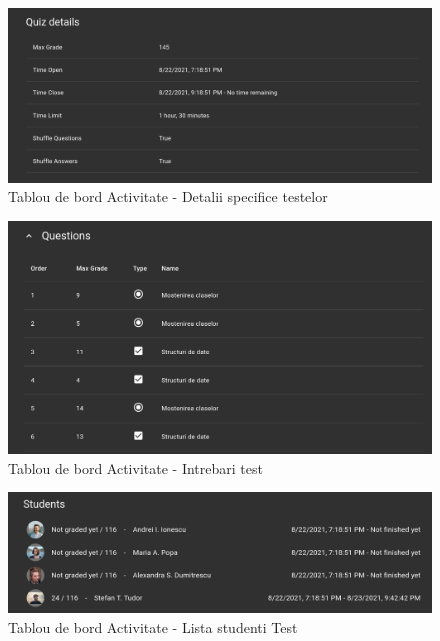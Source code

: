 \documentclass[12pt, a4paper, oneside, romanian]{teza-upb}
\begin{document}
\begin{figure}[H]
\centering
\includegraphics*[width=\columnwidth]{tablou-de-bord-activitate-detalii-specifice-testelor}
\caption{Tablou de bord Activitate - Detalii specifice testelor}
\label{tablou-de-bord-activitate-detalii-specifice-testelor}
\end{figure}

\begin{figure}[H]
\centering
\includegraphics*[width=\columnwidth]{tablou-de-bord-activitate-intrebari-test}
\caption{Tablou de bord Activitate - Intrebari test}
\label{tablou-de-bord-activitate-intrebari-test}
\end{figure}

\begin{figure}[H]
\centering
\includegraphics*[width=\columnwidth]{tablou-de-bord-activitate-lista-studenti-test}
\caption{Tablou de bord Activitate - Lista studenti Test}
\label{tablou-de-bord-activitate-lista-studenti-test}
\end{figure}
\end{document}
